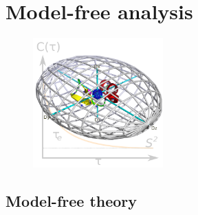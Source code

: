 
\chapter{Model-free analysis}
\label{ch: model-free}


\begin{figure}[h]
\includegraphics[width=5cm, bb=0 0 1701 1701]{graphics/analyses/model_free/model_free_600x600}
\end{figure}



\section{Model-free theory}



